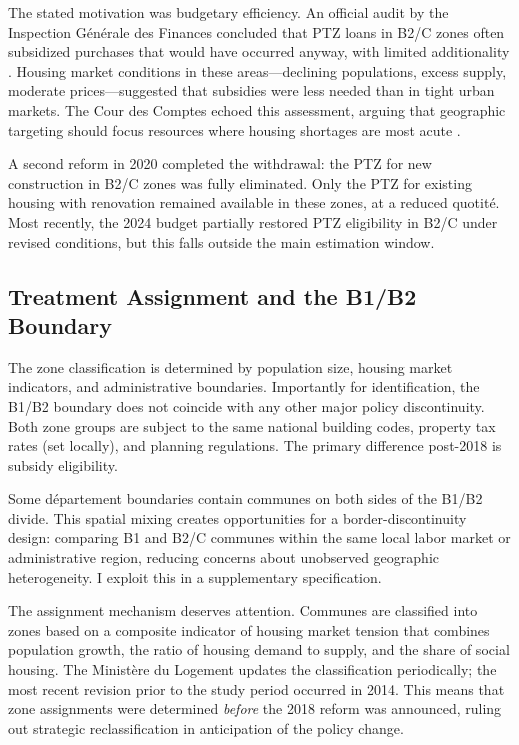 \documentclass[12pt]{article}
\begin{document}
The stated motivation was budgetary efficiency. An official audit by the Inspection G\'{e}n\'{e}rale des Finances concluded that PTZ loans in B2/C zones often subsidized purchases that would have occurred anyway, with limited additionality \citep{igf2019}. Housing market conditions in these areas---declining populations, excess supply, moderate prices---suggested that subsidies were less needed than in tight urban markets. The Cour des Comptes echoed this assessment, arguing that geographic targeting should focus resources where housing shortages are most acute \citep{courdescomptes2020}.

A second reform in 2020 completed the withdrawal: the PTZ for new construction in B2/C zones was fully eliminated. Only the PTZ for existing housing with renovation remained available in these zones, at a reduced quotit\'{e}. Most recently, the 2024 budget partially restored PTZ eligibility in B2/C under revised conditions, but this falls outside the main estimation window.

\subsection{Treatment Assignment and the B1/B2 Boundary}

The zone classification is determined by population size, housing market indicators, and administrative boundaries. Importantly for identification, the B1/B2 boundary does not coincide with any other major policy discontinuity. Both zone groups are subject to the same national building codes, property tax rates (set locally), and planning regulations. The primary difference post-2018 is subsidy eligibility.

Some département boundaries contain communes on both sides of the B1/B2 divide. This spatial mixing creates opportunities for a border-discontinuity design: comparing B1 and B2/C communes within the same local labor market or administrative region, reducing concerns about unobserved geographic heterogeneity. I exploit this in a supplementary specification.

The assignment mechanism deserves attention. Communes are classified into zones based on a composite indicator of housing market tension that combines population growth, the ratio of housing demand to supply, and the share of social housing. The Minist\`{e}re du Logement updates the classification periodically; the most recent revision prior to the study period occurred in 2014. This means that zone assignments were determined \textit{before} the 2018 reform was announced, ruling out strategic reclassification in anticipation of the policy change.
\end{document}
